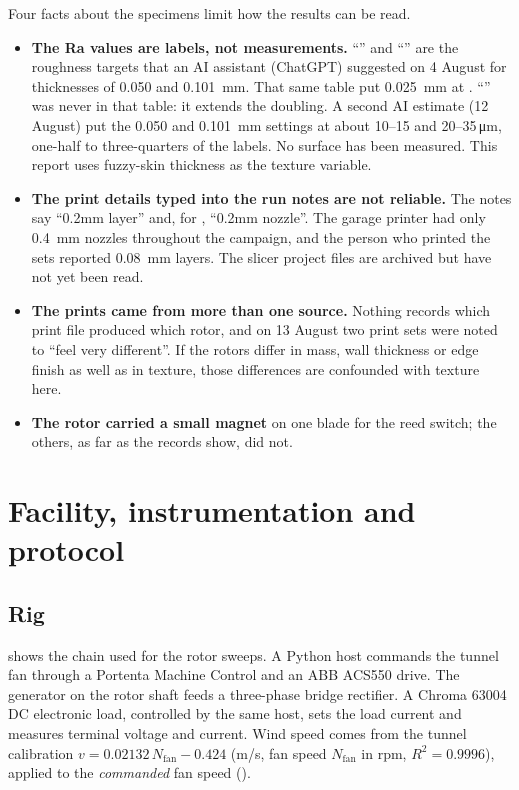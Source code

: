 \documentclass[11pt]{article}
\begin{document}
Four facts about the specimens limit how the results can be read.
\begin{itemize}
  \item \textbf{The Ra values are labels, not measurements.} ``'' and ``'' are
        the roughness targets that an AI assistant (ChatGPT) suggested on 4 August for
        thicknesses of 0.050 and \SI{0.101}{mm}. That same table put \SI{0.025}{mm} at
        . ``'' was never in that table: it extends the doubling. A second AI
        estimate (12 August) put the 0.050 and \SI{0.101}{mm} settings at about 10–15 and
        20–35\,\si{\micro m}, one-half to three-quarters of the labels. No surface has been measured. This report uses fuzzy-skin
        thickness as the texture variable.
  \item \textbf{The print details typed into the run notes are not reliable.} The notes say
        ``0.2mm layer'' and, for , ``0.2mm nozzle''. The garage printer had only
        \SI{0.4}{mm} nozzles throughout the campaign, and the person who printed the sets
        reported \SI{0.08}{mm} layers. The slicer project files are archived but have not yet
        been read.
  \item \textbf{The prints came from more than one source.} Nothing records which print file
        produced which rotor, and on 13 August two print sets were noted to ``feel very
        different''. If the rotors differ in mass, wall thickness or edge finish as well as
        in texture, those differences are confounded with texture here.
  \item \textbf{The  rotor carried a small magnet} on one blade for the reed switch; the
        others, as far as the records show, did not.
\end{itemize}

\section{Facility, instrumentation and protocol}\label{sec:method}

\subsection{Rig}
 shows the chain used for the rotor sweeps. A Python host commands the tunnel
fan through a Portenta Machine Control and an ABB ACS550 drive. The generator on the rotor
shaft feeds a three-phase bridge rectifier. A Chroma 63004 DC electronic load, controlled
by the same host, sets the load current and measures terminal voltage and current. Wind speed
comes from the tunnel calibration $v = 0.02132\,N_\text{fan} - 0.424$ (\si{m/s}, fan speed
$N_\text{fan}$ in rpm, $R^2=0.9996$), applied to the \emph{commanded} fan speed
().
\end{document}
